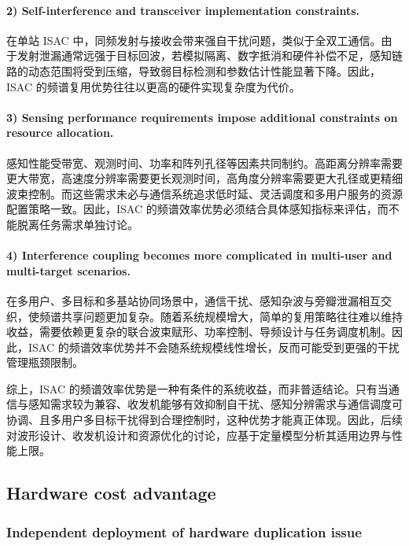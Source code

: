 \paragraph{2) Self-interference and transceiver implementation constraints.}
在单站 ISAC 中，同频发射与接收会带来强自干扰问题，类似于全双工通信\cite{Sabharwal2014InBandFullDuplex}。由于发射泄漏通常远强于目标回波，若模拟隔离、数字抵消和硬件补偿不足，感知链路的动态范围将受到压缩，导致弱目标检测和参数估计性能显著下降\cite{Gonzalez2024integrated,Bliss2007MIMOFullDuplex}。因此，ISAC 的频谱复用优势往往以更高的硬件实现复杂度为代价。

\paragraph{3) Sensing performance requirements impose additional constraints on resource allocation.}
感知性能受带宽、观测时间、功率和阵列孔径等因素共同制约。高距离分辨率需要更大带宽，高速度分辨率需要更长观测时间，高角度分辨率需要更大孔径或更精细波束控制\cite{Richards2014,SkolnikRadarBook}。而这些需求未必与通信系统追求低时延、灵活调度和多用户服务的资源配置策略一致。因此，ISAC 的频谱效率优势必须结合具体感知指标来评估，而不能脱离任务需求单独讨论。

\paragraph{4) Interference coupling becomes more complicated in multi-user and multi-target scenarios.}
在多用户、多目标和多基站协同场景中，通信干扰、感知杂波与旁瓣泄漏相互交织，使频谱共享问题更加复杂\cite{Liu2022ISAC,Cui2024integrated}。随着系统规模增大，简单的复用策略往往难以维持收益，需要依赖更复杂的联合波束赋形、功率控制、导频设计与任务调度机制\cite{Liu2020JointRadarComm,Gonzalez2024integrated}。因此，ISAC 的频谱效率优势并不会随系统规模线性增长，反而可能受到更强的干扰管理瓶颈限制。

综上，ISAC 的频谱效率优势是一种有条件的系统收益，而非普适结论。只有当通信与感知需求较为兼容、收发机能够有效抑制自干扰、感知分辨需求与通信调度可协调、且多用户多目标干扰得到合理控制时，这种优势才能真正体现。因此，后续对波形设计、收发机设计和资源优化的讨论，应基于定量模型分析其适用边界与性能上限。

\subsection{Hardware cost advantage}
\label{subsec:ch1-isac-core value-hardware}
\subsubsection{Independent deployment of hardware duplication issue}
\label{subsubsec:ch1-isac-core value-hardware-duplication}

